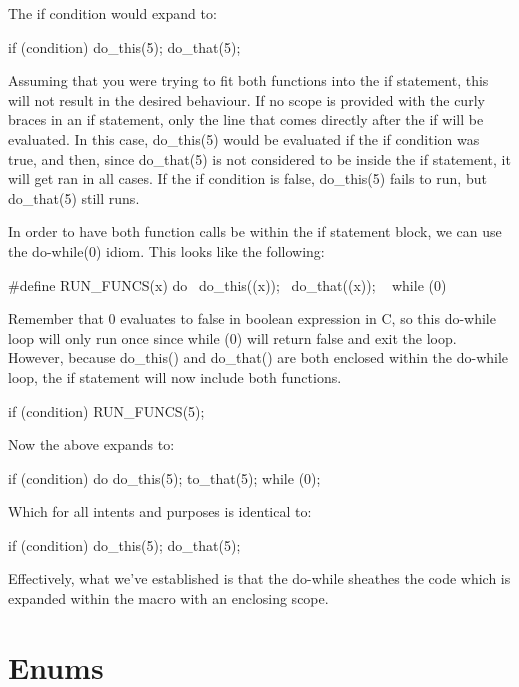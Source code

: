 \documentclass{article}
\begin{document}
The if condition would expand to:

\begin{cblk}
if (condition)
    do_this(5);
    do_that(5);
\end{cblk}

Assuming that you were trying to fit both functions into the if statement, this will not result in the desired
behaviour. If no scope is provided with the curly braces in an if statement, only the line that comes directly
after the if will be evaluated. In this case, do\_this(5) would be evaluated if the if condition was true, and
then, since do\_that(5) is not considered to be inside the if statement, it will get ran in all cases. If the
if condition is false, do\_this(5) fails to run, but do\_that(5) still runs.

In order to have both function calls be within the if statement block, we can use the do-while(0) idiom. This
looks like the following:

\begin{cblk}
#define RUN_FUNCS(x) do { \
            do_this((x)); \
            do_that((x)); \
            } while (0)
\end{cblk}

Remember that 0 evaluates to false in boolean expression in C, so this do-while loop will only run once since
while (0) will return false and exit the loop. However, because do\_this() and do\_that() are both enclosed
within the do-while loop, the if statement will now include both functions.

\begin{cblk}
if (condition)
    RUN_FUNCS(5);
\end{cblk}

Now the above expands to:

\begin{cblk}
if (condition)
    do {
        do_this(5);
        to_that(5);
    } while (0);
\end{cblk}

Which for all intents and purposes is identical to:

\begin{cblk}
if (condition) {
    do_this(5);
    do_that(5);
}
\end{cblk}

Effectively, what we've established is that the do-while sheathes the code which is expanded within the macro
with an enclosing scope.

\section{Enums}
\end{document}
